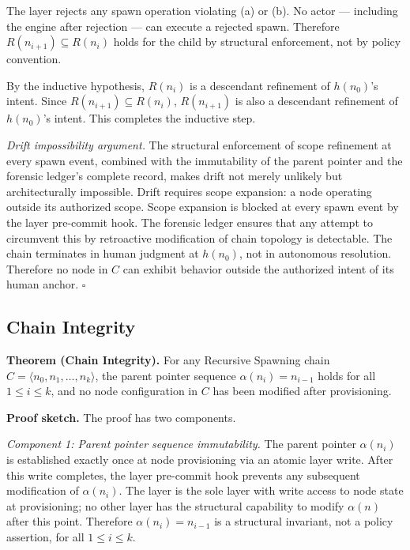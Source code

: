 The \fact{} layer rejects any spawn operation violating (a) or (b). No actor --- including the \bounds{} engine after rejection --- can execute a rejected spawn. Therefore $R(n_{i+1}) \subseteq R(n_i)$ holds for the child by structural enforcement, not by policy convention.

By the inductive hypothesis, $R(n_i)$ is a descendant refinement of $h(n_0)$'s intent. Since $R(n_{i+1}) \subseteq R(n_i)$, $R(n_{i+1})$ is also a descendant refinement of $h(n_0)$'s intent. This completes the inductive step.

\medskip
\textit{Drift impossibility argument.} The structural enforcement of scope refinement at every spawn event, combined with the immutability of the parent pointer and the forensic ledger's complete record, makes drift not merely unlikely but architecturally impossible. Drift requires scope expansion: a node operating outside its authorized scope. Scope expansion is blocked at every spawn event by the \fact{} layer pre-commit hook. The forensic ledger ensures that any attempt to circumvent this by retroactive modification of chain topology is detectable. The chain terminates in human judgment at $h(n_0)$, not in autonomous resolution. Therefore no node in $C$ can exhibit behavior outside the authorized intent of its human anchor. $\square$

\subsection{Chain Integrity}
\label{sec:rs-chain-integrity}

\medskip
\noindent\textbf{Theorem (Chain Integrity).} For any Recursive Spawning chain $C = \langle n_0, n_1, \ldots, n_k \rangle$, the parent pointer sequence $\alpha(n_i) = n_{i-1}$ holds for all $1 \leq i \leq k$, and no node configuration in $C$ has been modified after provisioning.

\medskip
\noindent\textbf{Proof sketch.} The proof has two components.

\medskip
\textit{Component 1: Parent pointer sequence immutability.} The parent pointer $\alpha(n_i)$ is established exactly once at node provisioning via an atomic \fact{} layer write. After this write completes, the \fact{} layer pre-commit hook prevents any subsequent modification of $\alpha(n_i)$. The \fact{} layer is the sole layer with write access to node state at provisioning; no other layer has the structural capability to modify $\alpha(n)$ after this point. Therefore $\alpha(n_i) = n_{i-1}$ is a structural invariant, not a policy assertion, for all $1 \leq i \leq k$.

